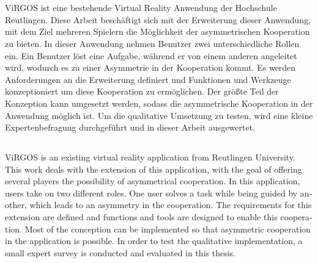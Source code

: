 \documentclass[12pt,oneside,a4paper]{article}
\begin{document}
\large


\section*{}
ViRGOS ist eine bestehende Virtual Reality Anwendung der Hochschule Reutlingen. Diese Arbeit beschäftigt sich mit der Erweiterung dieser Anwendung, mit dem Ziel mehreren Spielern die Möglichkeit der asymmetrischen Kooperation zu bieten. In dieser Anwendung nehmen Benutzer zwei unterschiedliche Rollen ein. Ein Benutzer löst eine Aufgabe, während er von einem anderen angeleitet wird, wodurch es zu einer Asymmetrie in der K­ooperation kommt. Es werden Anforderungen an die Erweiterung definiert und Funktionen und Werkzeuge konzeptioniert um diese Kooperation zu ermöglichen. Der größte Teil der Konzeption kann umgesetzt werden, sodass die asymmetrische Kooperation in der Anwendung möglich ist. Um die qualitative Umsetzung zu testen, wird eine kleine Expertenbefragung durchgeführt und in dieser Arbeit ausgewertet.\\

\begin{otherlanguage}{english}
\section*{}
ViRGOS is an existing virtual reality application from Reutlingen University. This work deals with the extension of this application, with the goal of offering several players the possibility of asymmetrical cooperation. In this application, users take on two different roles. One user solves a task while being guided by another, which leads to an asymmetry in the cooperation. The requirements for this extension are defined and functions and tools are designed to enable this cooperation. Most of the conception can be implemented so that asymmetric cooperation in the application is possible. In order to test the qualitative implementation, a small expert survey is conducted and evaluated in this thesis.\\
\end{otherlanguage}

\newpage

\tableofcontents

\newpage
\listoffigures




 



\newpage
\printbibliography[heading=bibintoc] 
\label{Anhang}


\end{document}
